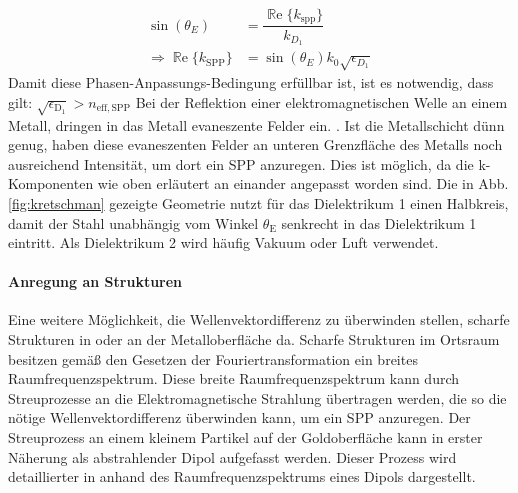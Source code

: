 \documentclass[titlepage]{article}
\renewcommand{\Re}{\operatorname{\mathbb{R}e}}
\begin{document}
			\begin{align}
				\label{eq:phase_condition_kretschmann}
				\sin(\theta_E) &= \dfrac{\Re\{k_{\mathrm{spp}}\}}{k_{D_1}}\\
				\Rightarrow \Re\{k_{\mathrm{SPP}}\} &= \sin(\theta_E) k_0 \sqrt{\epsilon_{D_1}}
			\end{align}
			Damit diese Phasen-Anpassungs-Bedingung erfüllbar ist, ist es notwendig, dass gilt: $\sqrt{\epsilon_\mathrm{D_1}} > n_\mathrm{eff, SPP}$
			Bei der Reflektion einer elektromagnetischen Welle an einem Metall, dringen in das Metall evaneszente Felder ein. \cite{Novotny.2012b}. Ist die Metallschicht dünn genug, haben diese evaneszenten Felder an unteren Grenzfläche des Metalls noch ausreichend Intensität, um dort ein SPP anzuregen. Dies ist möglich, da die k-Komponenten wie oben erläutert an einander angepasst worden sind. Die in Abb. \ref{fig:kretschman} gezeigte Geometrie nutzt für das Dielektrikum 1 einen Halbkreis, damit der Stahl unabhängig vom Winkel $\theta_\mathrm{E}$ senkrecht in das Dielektrikum 1 eintritt. Als Dielektrikum 2 wird häufig Vakuum oder Luft verwendet.			
		
			\paragraph{Anregung an Strukturen}
			Eine weitere Möglichkeit, die Wellenvektordifferenz zu überwinden stellen, scharfe Strukturen in oder an der Metalloberfläche da. Scharfe Strukturen im Ortsraum besitzen gemäß den Gesetzen der Fouriertransformation ein breites Raumfrequenzspektrum. Diese breite Raumfrequenzspektrum kann durch Streuprozesse an die Elektromagnetische Strahlung übertragen werden, die so die nötige Wellenvektordifferenz überwinden kann, um ein SPP anzuregen. Der Streuprozess an einem kleinem Partikel auf der Goldoberfläche kann in erster Näherung als abstrahlender Dipol aufgefasst werden. Dieser Prozess wird detaillierter in  anhand des Raumfrequenzspektrums eines Dipols dargestellt.
\end{document}
